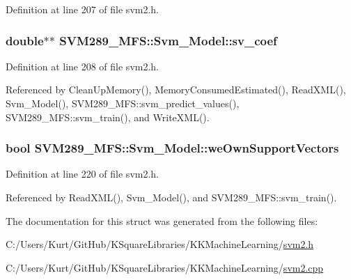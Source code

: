Definition at line 207 of file svm2.\+h.

\subsubsection[{\texorpdfstring{sv\+\_\+coef}{sv_coef}}]{\setlength{\rightskip}{0pt plus 5cm}double$\ast$$\ast$ S\+V\+M289\+\_\+\+M\+F\+S\+::\+Svm\+\_\+\+Model\+::sv\+\_\+coef}\hypertarget{struct_s_v_m289___m_f_s_1_1_svm___model_afc428150716a2373a251c57f7e68bad3}{}\label{struct_s_v_m289___m_f_s_1_1_svm___model_afc428150716a2373a251c57f7e68bad3}


Definition at line 208 of file svm2.\+h.



Referenced by Clean\+Up\+Memory(), Memory\+Consumed\+Estimated(), Read\+X\+M\+L(), Svm\+\_\+\+Model(), S\+V\+M289\+\_\+\+M\+F\+S\+::svm\+\_\+predict\+\_\+values(), S\+V\+M289\+\_\+\+M\+F\+S\+::svm\+\_\+train(), and Write\+X\+M\+L().

\subsubsection[{\texorpdfstring{we\+Own\+Support\+Vectors}{weOwnSupportVectors}}]{\setlength{\rightskip}{0pt plus 5cm}bool S\+V\+M289\+\_\+\+M\+F\+S\+::\+Svm\+\_\+\+Model\+::we\+Own\+Support\+Vectors}\hypertarget{struct_s_v_m289___m_f_s_1_1_svm___model_a92c6022c1bf0e7094d7815692f3ec0e9}{}\label{struct_s_v_m289___m_f_s_1_1_svm___model_a92c6022c1bf0e7094d7815692f3ec0e9}


Definition at line 220 of file svm2.\+h.



Referenced by Read\+X\+M\+L(), Svm\+\_\+\+Model(), and S\+V\+M289\+\_\+\+M\+F\+S\+::svm\+\_\+train().



The documentation for this struct was generated from the following files\+:\begin{DoxyCompactItemize}
\item 
C\+:/\+Users/\+Kurt/\+Git\+Hub/\+K\+Square\+Libraries/\+K\+K\+Machine\+Learning/\hyperlink{svm2_8h}{svm2.\+h}\item 
C\+:/\+Users/\+Kurt/\+Git\+Hub/\+K\+Square\+Libraries/\+K\+K\+Machine\+Learning/\hyperlink{svm2_8cpp}{svm2.\+cpp}\end{DoxyCompactItemize}
